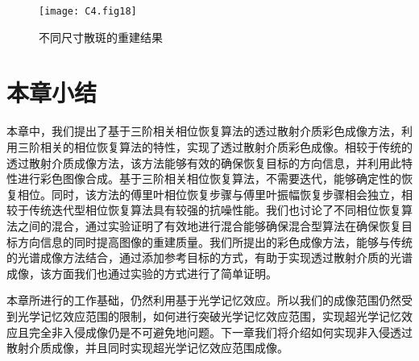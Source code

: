 \begin{figure}[htp]
	\centering
	\texttt{[image: C4.fig18]}
	\caption{不同尺寸散斑的重建结果}
	\label{fig:4.18}
\end{figure}
\section{本章小结}

本章中，我们提出了基于三阶相关相位恢复算法的透过散射介质彩色成像方法，利用三阶相关的相位恢复算法的特性，实现了透过散射介质彩色成像。相较于传统的透过散射介质成像方法，该方法能够有效的确保恢复目标的方向信息，并利用此特性进行彩色图像合成。基于三阶相关相位恢复算法，不需要迭代，能够确定性的恢复相位。同时，该方法的傅里叶相位恢复步骤与傅里叶振幅恢复步骤相会独立，相较于传统迭代型相位恢复算法具有较强的抗噪性能。我们也讨论了不同相位恢复算法之间的混合，通过实验证明了有效地进行混合能够确保混合型算法在确保恢复目标方向信息的同时提高图像的重建质量。我们所提出的彩色成像方法，能够与传统的光谱成像方法结合，通过添加参考目标的方式，有助于实现透过散射介质的光谱成像，该方面我们也通过实验的方式进行了简单证明。

本章所进行的工作基础，仍然利用基于光学记忆效应。所以我们的成像范围仍然受到光学记忆效应范围的限制，如何进行突破光学记忆效应范围，实现超光学记忆效应且完全非入侵成像仍是不可避免地问题。下一章我们将介绍如何实现非入侵透过散射介质成像，并且同时实现超光学记忆效应范围成像。
